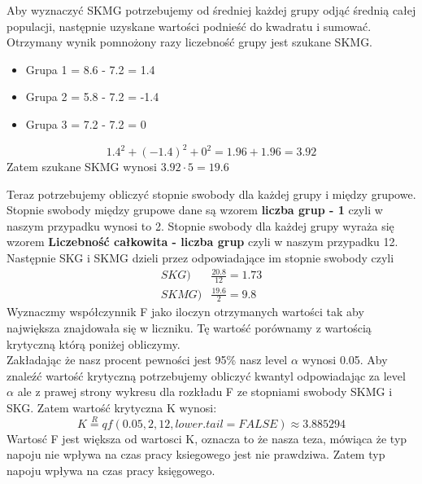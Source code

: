 \documentclass{article}
\begin{document}
Aby wyznaczyć SKMG potrzebujemy od średniej każdej grupy odjąć średnią całej populacji, następnie uzyskane wartości podnieść do kwadratu i sumować. Otrzymany wynik pomnożony razy liczebność grupy jest szukane SKMG.
\begin{itemize}
\item Grupa 1 = 8.6 - 7.2 = 1.4
\item Grupa 2 = 5.8 - 7.2 = -1.4
\item Grupa 3 = 7.2 - 7.2 = 0
\end{itemize}
\[
1.4^2 + (-1.4)^2 + 0^2 = 1.96 + 1.96 = 3.92
\]
Zatem szukane SKMG wynosi $3.92 \cdot 5 = 19.6$ \\ \par
Teraz potrzebujemy obliczyć stopnie swobody dla każdej grupy i między grupowe. Stopnie swobody między grupowe dane są wzorem \textbf{liczba grup - 1} czyli w naszym przypadku wynosi to 2. Stopnie swobody dla każdej grupy wyraża się wzorem \textbf{Liczebność całkowita - liczba grup} czyli w naszym przypadku 12. \\
Następnie SKG i SKMG dzieli przez odpowiadające im stopnie swobody czyli
\begin{align*}
SKG)& \frac{20.8}{12} = 1.73 \\
SKMG) & \frac{19.6}{2} = 9.8
\end{align*}
Wyznaczmy współczynnik F jako iloczyn otrzymanych wartości tak aby największa znajdowała się w liczniku. Tę wartość porównamy z wartością krytyczną którą poniżej obliczymy. \\
Zakładając że nasz procent pewności jest 95\% nasz level $\alpha$ wynosi 0.05. Aby znaleźć wartość krytyczną potrzebujemy obliczyć kwantyl odpowiadając za level $\alpha$ ale z prawej strony wykresu dla rozkładu F ze stopniami swobody SKMG i SKG. Zatem wartość krytyczna K wynosi:
\[
K \overset{R}{=} qf(0.05, 2, 12, lower.tail = FALSE) \approx 3.885294
\]
Wartosć F jest większa od wartosci K, oznacza to że nasza teza, mówiąca że typ napoju nie wpływa na czas pracy ksiegowego jest nie prawdziwa. Zatem typ napoju wpływa na czas pracy księgowego.

\newpage
\end{document}
